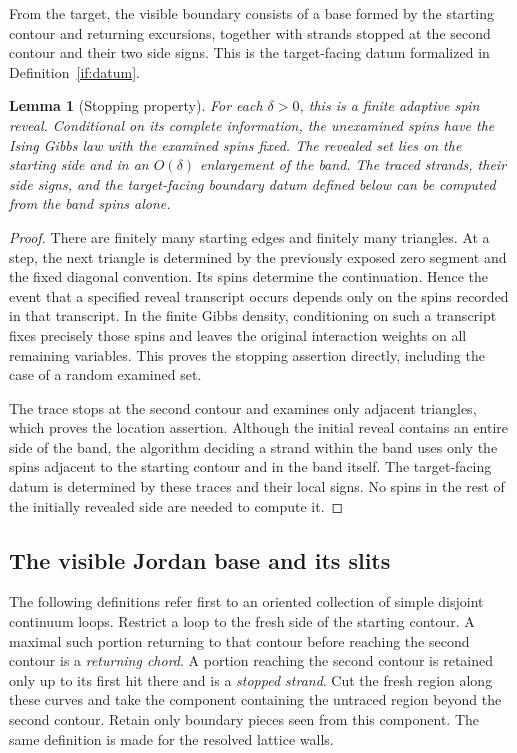 \documentclass[11pt]{article}
\newtheorem{lemma}[theorem]{Lemma}
\theoremstyle{definition}
\theoremstyle{remark}
\numberwithin{equation}{section}
\begin{document}
From the target, the visible boundary consists of a base formed by the
starting contour and returning excursions, together with strands stopped
at the second contour and their two side signs. This is the
target-facing datum formalized in Definition~\ref{if:datum}.

\begin{lemma}[Stopping property]\label{if:stopping}
For each $\delta>0$, this is a finite adaptive spin reveal.  Conditional
on its complete information, the unexamined spins have the Ising Gibbs
law with the examined spins fixed.  The revealed set lies on the starting
side and in an $O(\delta)$ enlargement of the band.  The traced strands,
their side signs, and the target-facing boundary datum defined below
can be computed from the band spins alone.
\end{lemma}

\begin{proof}
There are finitely many starting edges and finitely many triangles.
At a step, the next triangle is determined by the previously exposed
zero segment and the fixed diagonal convention.  Its spins determine
the continuation.  Hence the event that a specified reveal transcript
occurs depends only on the spins recorded in that transcript.  In the
finite Gibbs density, conditioning on such a transcript fixes precisely
those spins and leaves the original interaction weights on all remaining
variables.  This proves the stopping assertion directly, including the
case of a random examined set.

The trace stops at the second contour and examines only adjacent
triangles, which proves the location assertion.  Although the initial
reveal contains an entire side of the band, the algorithm deciding a
strand within the band uses only the spins adjacent to the starting
contour and in the band itself.  The target-facing datum is determined
by these traces and their local signs.  No spins in the rest of the
initially revealed side are needed to compute it.
\end{proof}

\subsection{The visible Jordan base and its slits}

The following definitions refer first to an oriented collection of
simple disjoint continuum loops.  Restrict a loop to the fresh side of
the starting contour.  A maximal such portion returning to that contour
before reaching the second contour is a \emph{returning chord}.  A
portion reaching the second contour is retained only up to its first
hit there and is a \emph{stopped strand}.  Cut the fresh region along
these curves and take the component containing the untraced region
beyond the second contour.  Retain only boundary pieces seen from this
component.  The same definition is made for the resolved lattice walls.
\end{document}
